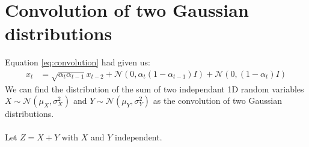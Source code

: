 \documentclass[twoside]{article}
\numberwithin{equation}{section}
\numberwithin{figure}{section}
\begin{document}
\newpage
\appendix
\section{Convolution of two Gaussian distributions}
\label{appendix:a}
Equation \ref{eq:convolution} had given us:
\begin{align*}
  x_t &= \sqrt{\alpha_t \alpha_{t-1}} x_{t-2} + \mathcal{N}\left(0, \alpha_t\left(1 - \alpha_{t-1}\right)I \right) + \mathcal{N}\left(0, (1 - \alpha_t) I \right)
\end{align*}
We can find the distribution of the sum of two independant 1D random variables $X \sim \mathcal{N}\left(\mu_X, \sigma_X^2\right)$ and $Y \sim \mathcal{N}\left(\mu_Y, \sigma_Y^2\right)$ as the convolution of two Gaussian distributions.
\\\\
Let $Z = X + Y$ with $X$ and $Y$ independent.
\end{document}
